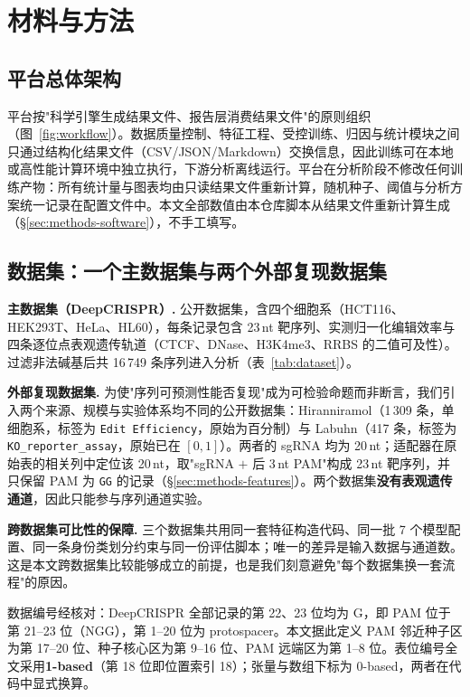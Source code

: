 \section{材料与方法}
\label{sec:methods}

\subsection{平台总体架构}

平台按"科学引擎生成结果文件、报告层消费结果文件"的原则组织（图~\ref{fig:workflow}）。数据质量控制、特征工程、受控训练、归因与统计模块之间只通过结构化结果文件（CSV/JSON/Markdown）交换信息，因此训练可在本地或高性能计算环境中独立执行，下游分析离线运行。平台在分析阶段不修改任何训练产物：所有统计量与图表均由只读结果文件重新计算，随机种子、阈值与分析方案统一记录在配置文件中。本文全部数值由本仓库脚本从结果文件重新计算生成（\S\ref{sec:methods-software}），不手工填写。

\subsection{数据集：一个主数据集与两个外部复现数据集}
\label{sec:methods-datasets}

\textbf{主数据集（DeepCRISPR）.} 公开数据集\citep{Chuai2018GenomeBiol}，含四个细胞系（HCT116、HEK293T、HeLa、HL60），每条记录包含 23\,nt 靶序列、实测归一化编辑效率与四条逐位点表观遗传轨道（CTCF、DNase、H3K4me3、RRBS 的二值可及性）。过滤非法碱基后共 16\,749 条序列进入分析（表~\ref{tab:dataset}）。

\textbf{外部复现数据集.} 为使"序列可预测性能否复现"成为可检验命题而非断言，我们引入两个来源、规模与实验体系均不同的公开数据集：Hiranniramol（1\,309 条，单细胞系，标签为 \texttt{Edit Efficiency}，原始为百分制）\citep{Hiranniramol2020Bioinformatics}与 Labuhn（417 条，标签为 \texttt{KO\_reporter\_assay}，原始已在 $[0,1]$）\citep{Labuhn2018NAR}。两者的 sgRNA 均为 20\,nt；适配器在原始表的相关列中定位该 20\,nt，取"sgRNA $+$ 后 3\,nt PAM"构成 23\,nt 靶序列，并只保留 PAM 为 \texttt{GG} 的记录（\S\ref{sec:methods-features}）。两个数据集\textbf{没有表观遗传通道}，因此只能参与序列通道实验。

\textbf{跨数据集可比性的保障.} 三个数据集共用同一套特征构造代码、同一批 7 个模型配置、同一条身份类划分约束与同一份评估脚本；唯一的差异是输入数据与通道数。这是本文跨数据集比较能够成立的前提，也是我们刻意避免"每个数据集换一套流程"的原因。

数据编号经核对：DeepCRISPR 全部记录的第 22、23 位均为 G，即 PAM 位于第 21--23 位（NGG），第 1--20 位为 protospacer。本文据此定义 PAM 邻近种子区为第 17--20 位、种子核心区为第 9--16 位、PAM 远端区为第 1--8 位。表位编号全文采用\textbf{1-based}（第 18 位即位置索引 18）；张量与数组下标为 0-based，两者在代码中显式换算。

